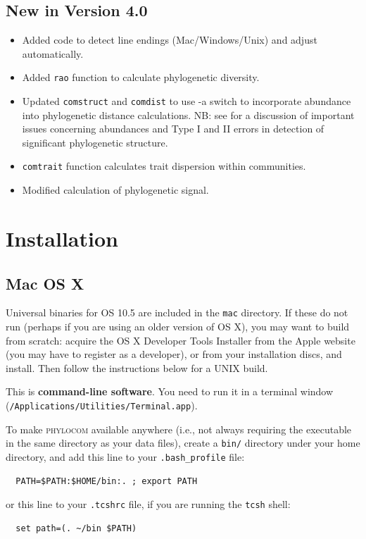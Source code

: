 \documentclass[12pt,letterpaper]{article}
\begin{document}
\subsection{New in Version 4.0}

\begin{itemize}
 \item Added code to detect line endings (Mac/Windows/Unix) and adjust
   automatically.
 \item Added \verb|rao| function to calculate phylogenetic diversity.
 \item Updated  \verb|comstruct| and  \verb|comdist| to use -a switch
to incorporate abundance into phylogenetic distance calculations.  NB:
see \citet{hardy2008tes} for a discussion of important issues
concerning abundances and Type I and II errors in detection of significant
phylogenetic structure.
 \item  \verb|comtrait| function calculates trait dispersion within communities.
 \item Modified calculation of phylogenetic signal.
\end{itemize}

\section{Installation}

\subsection{Mac OS X}

Universal binaries for OS 10.5 are included in the \verb|mac|
directory. If these do not run (perhaps if you are using an older
version of OS X), you may want to build from scratch: acquire the OS X
Developer Tools Installer from the Apple website (you may have to
register as a developer), or from your installation discs, and
install.  Then follow the instructions below for a UNIX build.

This is {\bf command-line software}. You need to run it in a terminal
window (\verb|/Applications/|\-\verb|Utilities/|\-\verb|Terminal.app|).

To make {\scshape phylocom} available anywhere (i.e., not always
requiring the executable in the same directory as your data files),
create a \verb|bin/| directory under your home directory, and add this
line to your \verb|.bash_profile| file:
\begin{verbatim}
  PATH=$PATH:$HOME/bin:. ; export PATH
\end{verbatim}
or this line to your \verb|.tcshrc| file, if you are running the
\verb|tcsh| shell:
\begin{verbatim}
  set path=(. ~/bin $PATH)
\end{verbatim}
\end{document}
